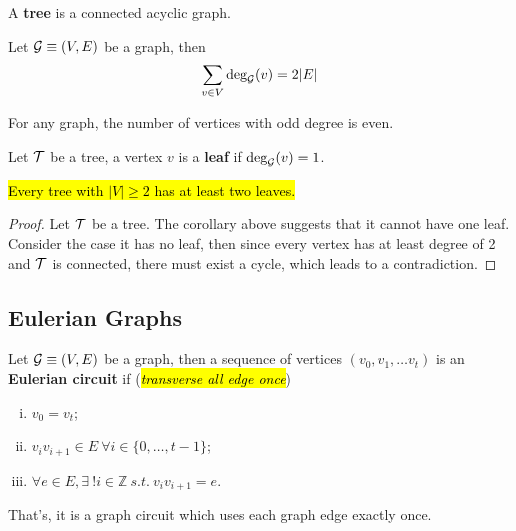\documentclass{article}
\def\Z{{\mathbb Z}}
\begin{document}
		\begin{definition}
			A \textbf{tree} is a connected acyclic graph.
		\end{definition}
		
%		
		
		\begin{theorem}
			Let $\mathcal{{G}} \equiv (V, E)$ be a graph, then
			\begin{equation}
				\sum_{v \in V}\text{{deg}}_{\mathcal{{G}}}(v) = 2 |E|
			\end{equation}
		\end{theorem}
		
		\begin{corollary}
			For any graph, the number of vertices with odd degree is even.
		\end{corollary}
		
		\begin{definition}
			Let $\mathcal{{T}}$ be a tree, a vertex $v$ is a \textbf{leaf} if $\text{{deg}}_{\mathcal{{G}}}(v)=1$.
		\end{definition}
		
		\begin{theorem}
			\hl{Every tree with $|V| \geq 2$ has at least two leaves.}
			\begin{proof}
				Let $\mathcal{{T}}$ be a tree. The corollary above suggests that it cannot have one leaf. Consider the case it has no leaf, then since every vertex has at least degree of 2 and $\mathcal{{T}}$ is connected, there must exist a cycle, which leads to a contradiction.
			\end{proof}
		\end{theorem}
		
		\subsection{Eulerian Graphs}
			\begin{definition}
				Let $\mathcal{{G}} \equiv (V, E)$ be a graph, then a sequence of vertices $(v_0,v_1,\dots v_t)$ is an \textbf{Eulerian circuit} if (\hl{\emph{transverse all edge once}})
				\begin{enumerate}[(i)]
					\item $v_0 = v_t$;
					\item $v_i v_{i+1} \in E\ \forall i \in \{0, \dots, t-1\}$;
					\item $\forall e \in E, \exists\ ! i \in \Z\ s.t.\ v_i v_{i+1} = e$.
				\end{enumerate}
				That's, it is a graph circuit which uses each graph edge exactly once.
			\end{definition}
			
\end{document}
